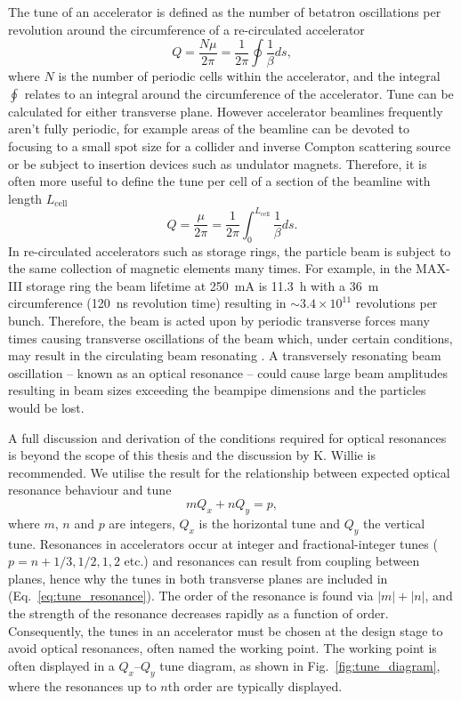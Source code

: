 \documentclass[../main.tex]{subfiles}
\begin{document}
The tune of an accelerator is defined as the number of betatron oscillations per revolution around the circumference of a re-circulated accelerator
\begin{equation}
Q=\frac{N\mu}{2\pi} = \frac{1}{2\pi}\oint\frac{1}{\beta}ds,
\label{eq:accelerator_tune}    
\end{equation}
where $N$ is the number of periodic cells within the accelerator, and the integral $\oint$ relates to an integral around the circumference of the accelerator. Tune can be calculated for either transverse plane. However accelerator beamlines frequently aren't fully periodic, for example areas of the beamline can be devoted to focusing to a small spot size for a collider and inverse Compton scattering source or be subject to insertion devices such as undulator magnets. Therefore, it is often more useful to define the tune per cell of a section of the beamline with length $L_{\mathrm{cell}}$
\begin{equation}
Q=\frac{\mu}{2\pi} = \frac{1}{2\pi}\int_{0}^{L_{\mathrm{cell}}}\frac{1}{\beta}ds. 
\label{eq:tune_per_cell}    
\end{equation}
In re-circulated accelerators such as storage rings, the particle beam is subject to the same collection of magnetic elements many times. For example, in the MAX-III storage ring the beam lifetime at 250~\si{\milli\ampere} is 11.3~\si{\hour} with a 36~\si{\meter} circumference (120~\si{\nano\second} revolution time) resulting in $\sim3.4\times 10^{11}$ revolutions per bunch. Therefore, the beam is acted upon by periodic transverse forces many times causing transverse oscillations of the beam which, under certain conditions, may result in the circulating beam resonating \cite{wille2000physics}. A transversely resonating beam oscillation -- known as an optical resonance -- could cause large beam amplitudes resulting in beam sizes exceeding the beampipe dimensions and the particles would be lost.

A full discussion and derivation of the conditions required for optical resonances is beyond the scope of this thesis and the discussion by K. Willie \cite{wille2000physics} is recommended. We utilise the result for the relationship between expected optical resonance behaviour and tune
\begin{equation}
mQ_{x}+nQ_{y} = p,
\label{eq:tune_resonances}    
\end{equation}
where $m$, $n$ and $p$ are integers, $Q_{x}$ is the horizontal tune and $Q_{y}$ the vertical tune. Resonances in accelerators occur at integer and fractional-integer tunes ($p = n + 1/3, 1/2, 1, 2$ etc.) and resonances can result from coupling between planes, hence why the tunes in both transverse planes are included in (Eq.~\ref{eq:tune_resonance}). The order of the resonance is found via $\left|m\right| + \left|n\right|$, and the strength of the resonance decreases rapidly as a function of order. Consequently, the tunes in an accelerator must be chosen at the design stage to avoid optical resonances, often named the working point. The working point is often displayed in a $Q_{x}$--$Q_{y}$ tune diagram, as shown in Fig.~\ref{fig:tune_diagram}, where the resonances up to $n$th order are typically displayed.  
\end{document}
